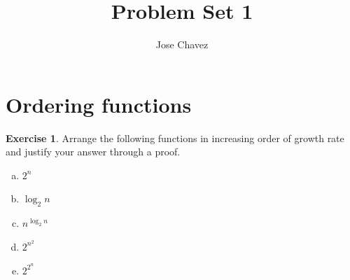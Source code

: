 \documentclass{article}
\title{Problem Set 1}
\author{Jose Chavez}
\theoremstyle{definition}
\newtheorem{exercise}{Exercise}[section]
\begin{document}
\maketitle


\section{Ordering functions}

\begin{exercise}
    Arrange the following functions in increasing order of growth rate and justify your answer through a proof. 

    \begin{enumerate}[a)]
        \item $2^n$
        \item $\log_2 n$
        \item $n^{\log_2n}$
        \item $2^{n^2}$
        \item $2^{2^n}$
    \end{enumerate} 


\end{exercise}
\end{document}
